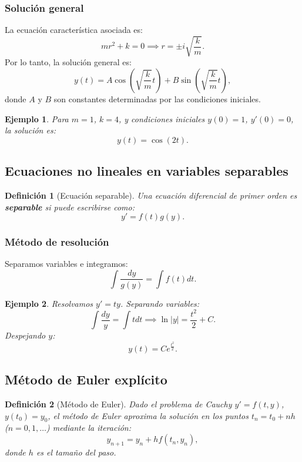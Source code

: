 \documentclass[12pt, a4paper]{article}
\theoremstyle{rioplatense}
\newtheorem{definicion}{Definición}[section]
\newtheorem{ejemplo}{Ejemplo}[section]
\begin{document}
\subsubsection{Solución general}
La ecuación característica asociada es:
$$
m r^2 + k = 0 \implies r = \pm i \sqrt{\frac{k}{m}}.
$$
Por lo tanto, la solución general es:
$$
y(t) = A \cos\left(\sqrt{\frac{k}{m}} t\right) + B \sin\left(\sqrt{\frac{k}{m}} t\right),
$$
donde $A$ y $B$ son constantes determinadas por las condiciones iniciales.

\begin{ejemplo}
    Para $m = 1$, $k = 4$, y condiciones iniciales $y(0) = 1$, $y'(0) = 0$, la solución es:
    $$
    y(t) = \cos(2t).
    $$
\end{ejemplo}

\subsection{Ecuaciones no lineales en variables separables}
\begin{definicion}[Ecuación separable]
    Una ecuación diferencial de primer orden es \textbf{separable} si puede escribirse como:
    $$
    y' = f(t) g(y).
    $$
\end{definicion}

\subsubsection{Método de resolución}
Separamos variables e integramos:
$$
\int \frac{dy}{g(y)} = \int f(t)  dt.
$$

\begin{ejemplo}
    Resolvamos $y' = t y$. Separando variables:
    $$
    \int \frac{dy}{y} = \int t  dt \implies \ln|y| = \frac{t^2}{2} + C.
    $$
    Despejando $y$:
    $$
    y(t) = C e^{\frac{t^2}{2}}.
    $$
\end{ejemplo}

\subsection{Método de Euler explícito}
\begin{definicion}[Método de Euler]
    Dado el problema de Cauchy $y' = f(t, y)$, $y(t_0) = y_0$, el método de Euler aproxima la solución en los puntos $t_n = t_0 + n h$ ($n = 0, 1, \ldots$) mediante la iteración:
    $$
    y_{n+1} = y_n + h f(t_n, y_n),
    $$
    donde $h$ es el tamaño del paso.
\end{definicion}
\end{document}
